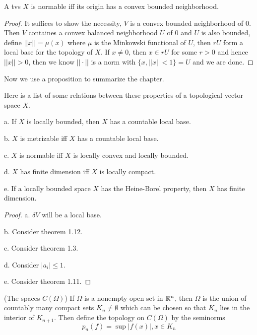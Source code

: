 \begin{theorem}
    A tvs $X$ is normable iff its origin has a convex bounded neighborhood.
\end{theorem}
\begin{proof}
    It suffices to show the necessity, $V$ is a convex bounded neighborhood of $0$. Then $V$ containes a convex balanced neighborhood $U$ of $0$ and $U$ is also bounded, define $||x|| = \mu(x)$ where $\mu$ is the Minkowski functional of $U$, then $rU$ form a local base for the topology of $X$. If $x\neq 0$, then $x\in rU$ for some $r>0$ and hence $||x|| > 0$,  then we know $||\cdot||$ is a norm with $\{x,||x|| < 1\} = U$ and we are done.
\end{proof}

Now we use a proposition to summarize the chapter.

\begin{proposition}
    Here is a list of some relations between these properties of a topological vector space $X$.\par
    a. If $X$ is locally bounded, then $X$ has a countable local base.\par
    b. $X$ is metrizable iff $X$ has a countable local base.\par
    c. $X$ is normable iff $X$ is locally convex and locally bounded.\par
    d. $X$ has finite dimension iff $X$ is locally compact.\par
    e. If a locally bounded space $X$ has the Heine-Borel property, then $X$ has finite dimension.
\end{proposition}
\begin{proof}
    a. $\delta V$ will be a local base.\par
    b. Consider theorem 1.12.\par
    c. Consider theorem 1.3.\par
    d. Consider $|a_i| \leq 1$.\par
    e. Consider theorem 1.11.
\end{proof}

\begin{definition}
    (The spaces $C(\Omega)$) If $\Omega$ is a nonempty open set in $\mathbb{R}^n$, then $\Omega$ is the union of countably many compact sets $K_n \neq \emptyset$ which can be chosen so that $K_n$ lies in the interior of $K_{n+1}$. Then define the topology on $C(\Omega)$ by the seminorms
    \[p_n(f) = \sup{|f(x)|, x\in K_n}\]
\end{definition}

